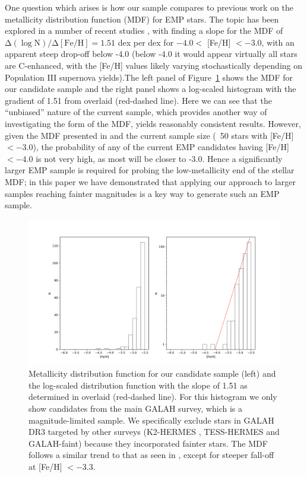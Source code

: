 \documentclass[]{aastex631}
\begin{document}
One question which arises is how our sample compares to previous work on the metallicity distribution function (MDF) for EMP stars. The topic has been explored in a number of recent studies \citep[e.g.,][]{DaCosta2019,2020MNRAS.492.4986Y, 2021MNRAS.507.4102Y}, with
\citet{2021MNRAS.507.4102Y} finding a slope for the MDF of $\mathrm{{\Delta(\log N)}/{\Delta[Fe/H] } = 1.51}$ dex per dex for $-4.0<$ [Fe/H] $<-3.0$, with an apparent steep drop-off below -4.0 (below -4.0 it would appear virtually all stars are C-enhanced, with the [Fe/H] values likely varying stochastically depending on Population III supernova yields).The left panel of Figure~\ref{fig:mdf} shows the MDF for our candidate sample and the right panel shows a log-scaled histogram with the gradient of 1.51 from \citet{2021MNRAS.507.4102Y} overlaid (red-dashed line).
Here we can see that the ``unbiased” nature of the current sample, which provides another way of investigating the form of the MDF, yields reasonably consistent results. However, given the MDF presented in \citet{2021MNRAS.507.4102Y}  and the current sample size (~50 stars with [Fe/H] $<-3.0$), the probability of any of the current EMP candidates having [Fe/H] $<-4.0$ is not very high, as most will be closer to -3.0. Hence a significantly larger EMP sample is required for probing the low-metallicity end of the stellar MDF; in this paper we have demonstrated that applying our approach to larger samples reaching fainter magnitudes is a key way to generate such an EMP sample.

\begin{figure}
\includegraphics[width=\linewidth]{Plots/Figure13.png}
\caption{Metallicity distribution function for our candidate sample (left) and the log-scaled distribution function with the slope of 1.51 as determined in \citet{2021MNRAS.507.4102Y}  overlaid (red-dashed line). For this histogram we only show candidates from the main GALAH survey, which is a magnitude-limited sample. We specifically exclude stars in GALAH DR3 targeted by other surveys (K2-HERMES \cite{2018AJ....155...84W}, TESS-HERMES \cite{2018MNRAS.473.2004S} and GALAH-faint) because they incorporated fainter stars. The MDF follows a similar trend to that as seen in \citet{2021MNRAS.507.4102Y}, except for steeper fall-off at [Fe/H] $<-3.3$.}
\label{fig:mdf}
\end{figure}
\end{document}
